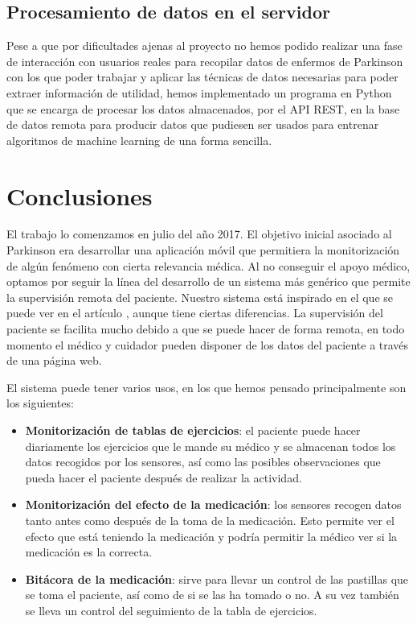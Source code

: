 \documentclass[11pt,spanish]{article}
\begin{document}
\subsection{Procesamiento de datos en el servidor}

Pese a que por dificultades ajenas al proyecto no hemos podido realizar una fase de interacción con usuarios reales para recopilar datos de enfermos de Parkinson con los que poder trabajar y aplicar las técnicas de datos necesarias para poder extraer información de utilidad, hemos implementado un programa en Python que se encarga de procesar los datos almacenados, por el API REST, en la base de datos remota para producir datos que pudiesen ser usados para entrenar algoritmos de machine learning de una forma sencilla.
\newpage

\section{Conclusiones}
El trabajo lo comenzamos en julio del año 2017. El objetivo inicial asociado al Parkinson era desarrollar una aplicación móvil que permitiera la monitorización de algún fenómeno con cierta relevancia médica. Al no conseguir el apoyo médico, optamos por seguir la línea del desarrollo de un sistema más genérico que permite la supervisión remota del paciente. Nuestro sistema está inspirado en el que se puede ver en el artículo \cite{resumen1}, aunque tiene ciertas diferencias. La supervisión del paciente se facilita mucho debido a que se puede hacer de forma remota, en todo momento el médico y cuidador pueden disponer de los datos del paciente a través de una página web.
\newline

El sistema puede tener varios usos, en los que hemos pensado principalmente son los siguientes:

\begin{itemize}
	\item {\bf Monitorización de tablas de ejercicios}: el paciente puede hacer diariamente los ejercicios que le mande su médico y se almacenan todos los datos recogidos por los sensores, así como las posibles observaciones que pueda hacer el paciente después de realizar la actividad.
    \item {\bf Monitorización del efecto de la medicación}: los sensores recogen datos tanto antes como después de la toma de la medicación. Esto permite ver el efecto que está teniendo la medicación y podría permitir la médico ver si la medicación es la correcta.
    \item {\bf Bitácora de la medicación}: sirve para llevar un control de las pastillas que se toma el paciente, así como de si se las ha tomado o no. A su vez también se lleva un control del seguimiento de la tabla de ejercicios.
\end{itemize}
\end{document}
